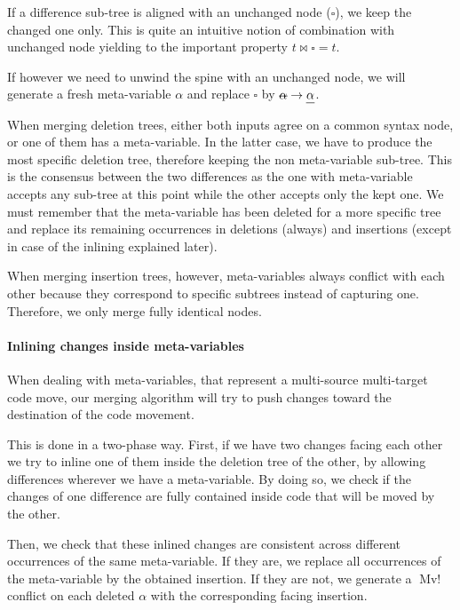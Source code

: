 \documentclass[a4paper,11pt]{article}
\newcommand\merge{\mathbin{\Join}}
\newcommand\del[1]{\text{\st{$#1$}}}
\newcommand\ins[1]{\text{\ul{$#1$}}}
\newcommand\id{\square}
\newcommand\change[2]{\del{#1} \rightarrow \ins{#2}}
\DeclareMathOperator\MvConflict{Mv!}
\begin{document}
If a difference sub-tree is aligned with an unchanged node ($\square$), we keep
the changed one only. This is quite an intuitive notion of combination with
unchanged node yielding to the important property $t \merge \square = t$.

If however we need to unwind the spine with an unchanged node, we will generate
a fresh meta-variable $\alpha$ and replace $\id$ by $\change{\alpha}{\alpha}$.

When merging deletion trees, either both inputs agree on a common syntax node,
or one of them has a meta-variable. In the latter case, we have to produce the
most specific deletion tree, therefore keeping the non meta-variable sub-tree.
This is the consensus between the two differences as the one with meta-variable
accepts any sub-tree at this point while the other accepts only the kept one. We
must remember that the meta-variable has been deleted for a more specific tree
and replace its remaining occurrences in deletions (always) and insertions
(except in case of the inlining explained later).


When merging insertion trees, however, meta-variables always conflict with each
other because they correspond to specific subtrees instead of capturing one.
Therefore, we only merge fully identical nodes.

\paragraph{Inlining changes inside meta-variables}
When dealing with meta-variables, that represent a multi-source
multi-target code move, our merging algorithm will try to push changes
toward the destination of the code movement.

This is done in a two-phase way. First, if we have two changes facing each other
we try to inline one of them inside the deletion tree of the other, by allowing
differences wherever we have a meta-variable. By doing so, we check if the
changes of one difference are fully contained inside code that will be moved by
the other.

Then, we check that these inlined changes are consistent across different
occurrences of the same meta-variable. If they are, we replace all occurrences
of the meta-variable by the obtained insertion. If they are not, we generate a
$\MvConflict$ conflict on each deleted $\alpha$ with the corresponding facing
insertion.
\end{document}
